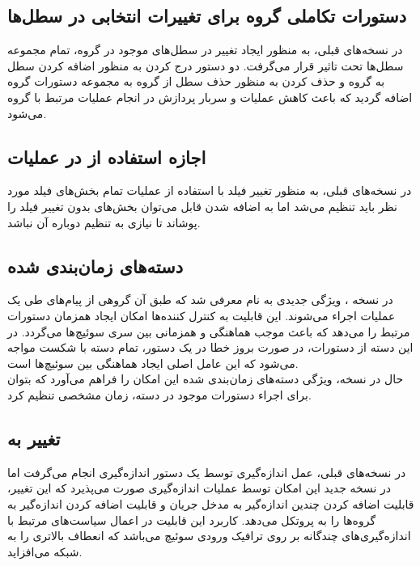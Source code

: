 \subsection{دستورات تکاملی گروه برای تغییرات انتخابی در سطل‌ها}
در نسخه‌های قبلی، به منظور ایجاد تغییر در سطل‌های موجود در گروه، تمام مجموعه سطل‌ها تحت تاثیر قرار می‌گرفت. دو دستور درج کردن به منظور اضافه کردن سطل به گروه و حذف کردن به منظور حذف سطل از گروه به مجموعه دستورات گروه اضافه گردید که باعث کاهش عملیات و سربار پردازش در انجام عملیات مرتبط با گروه می‌شود.

\subsection{اجازه استفاده از  در عملیات }
در نسخه‌های قبلی، به منظور تغییر فیلد با استفاده از عملیات  تمام بخش‌های فیلد مورد نظر باید تنظیم می‌شد اما به اضافه شدن قابل  می‌توان بخش‌های بدون تغییر فیلد را پوشاند تا نیازی به تنظیم دوباره آن نباشد.

\subsection{دسته‌های زمان‌بندی شده}
در نسخه ، ویژگی جدیدی به نام  معرفی شد که طبق آن گروهی از پیام‌های  طی یک عملیات اجراء می‌شوند. این قابلیت به کنترل کننده‌ها امکان ایجاد همزمان دستورات مرتبط را می‌دهد که باعث موجب هماهنگی و همزمانی بین سری سوئیچ‌ها می‌گردد. در این دسته از دستورات، در صورت بروز خطا در یک دستور، تمام دسته با شکست مواجه می‌شود که این عامل اصلی ایجاد هماهنگی بین سوئیچ‌ها است.\\
حال در نسخه، ویژگی دسته‌های زمان‌بندی شده این امکان را فراهم می‌آورد که بتوان برای اجراء دستورات موجود در دسته، زمان مشخصی تنظیم کرد.

\subsection{تغییر  به }
در نسخه‌های قبلی، عمل اندازه‌گیری توسط یک دستور اندازه‌گیری انجام می‌گرفت اما در نسخه جدید این امکان توسط عملیات اندازه‌گیری صورت می‌پذیرد که این تغییر، قابلیت اضافه کردن چندین اندازه‌گیر به مدخل جریان و قابلیت اضافه کردن اندازه‌گیر به گروه‌ها را به پروتکل می‌دهد. کاربرد این قابلیت در اعمال سیاست‌های مرتبط با اندازه‌گیری‌های چندگانه بر روی ترافیک ورودی سوئیچ می‌باشد که انعطاف بالاتری را به شبکه می‌افزاید.

